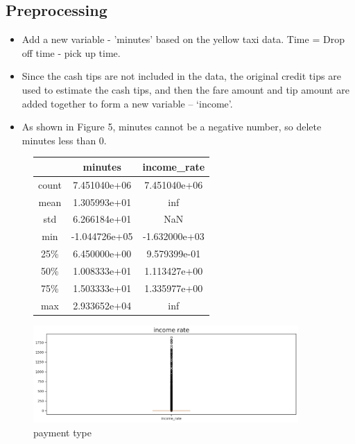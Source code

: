 \documentclass[11pt]{article}
\begin{document}
\subsection {Preprocessing}
\begin{itemize}
    \item Add a new variable - 'minutes' based on the yellow taxi data. Time = Drop off time - pick up time.
\end{itemize}
\begin{itemize}
    \item Since the cash tips are not included in the data, the original credit tips are used to estimate the cash tips, and then the fare amount and tip amount are added together to form a new variable – ‘income’.
\end{itemize}
\begin{itemize}
    \item As shown in Figure 5, minutes cannot be a negative number, so delete minutes less than 0.
\end{itemize}
\begin{figure}
  \begin{minipage}[b]{0.5\textwidth} 
    \centering
    \begin{tabular}{c|c|c} \hline
    & minutes & income\_rate \\ \hline
    count & 7.451040e+06 &	7.451040e+06 \\
    mean & 1.305993e+01 & inf \\
    std & 6.266184e+01 & NaN \\
    min & -1.044726e+05 & -1.632000e+03 \\
    25\% &	6.450000e+00 & 9.579399e-01 \\
    50\% &	1.008333e+01 &	1.113427e+00 \\
    75\% &	1.503333e+01 &	1.335977e+00 \\
    max & 2.933652e+04 & inf\\
    \hline
    \end{tabular} 
    \caption{}
    \label{tab:my_label}
  \end{minipage}%
  \begin{minipage}[b]{0.5\textwidth} 
    \centering 
    \includegraphics[width=0.9\textwidth]{plots/income rate.jpg} 
    \caption{payment type}
    \label{fig:by:table} 
\end{minipage} 
\end{figure}
\end{document}
